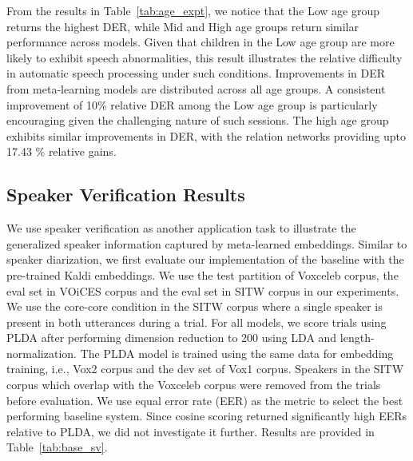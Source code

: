 From the results in Table~\ref{tab:age_expt}, we notice that the Low age group returns the highest DER, while Mid and High age groups return similar performance across models. Given that children in the Low age group are more likely to exhibit speech abnormalities, this result illustrates the relative difficulty in automatic speech processing under such conditions. Improvements in DER from meta-learning models are distributed across all age groups.
A consistent improvement of 10\% relative DER among the Low age group is particularly encouraging given the challenging nature of such sessions. The high age group exhibits similar improvements in DER, with the relation networks providing upto 17.43 \% relative gains. 

\subsection{Speaker Verification Results}

We use speaker verification as another application task to illustrate the generalized speaker information captured by meta-learned embeddings. Similar to speaker diarization, we first evaluate our implementation of the baseline with the pre-trained Kaldi embeddings. We use the test partition of Voxceleb corpus, the eval set in VOiCES corpus and the eval set in SITW corpus in our experiments.
We use the core-core condition in the SITW corpus where a single speaker is present in both utterances during a trial. For all models, we score trials using PLDA after performing dimension reduction to 200 using LDA and length-normalization. The PLDA model is trained using the same data for embedding training, i.e., Vox2 corpus and the dev set of Vox1 corpus. Speakers in the SITW corpus which overlap with the Voxceleb corpus were removed from the trials before evaluation.
We use equal error rate (EER) as the metric to select the best performing baseline system. 
Since cosine scoring returned significantly high EERs relative to PLDA, we did not investigate it further.
Results are provided in Table~\ref{tab:base_sv}.

\begin{table}[h]
\caption{Selecting a baseline system for speaker verification. Results are presented as equal error rate (EER \%)}
\label{tab:base_sv}
\end{table}

